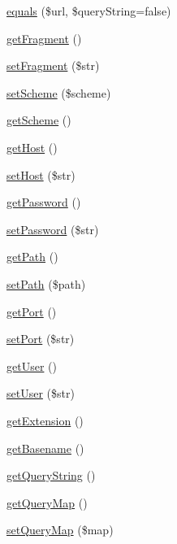 \begin{DoxyCompactItemize}
\item 
\hyperlink{classTk_1_1Url_a4443ec0cf0873b3e31e0676c4fb6e423}{equals} (\$url, \$query\+String=false)
\item 
\hyperlink{classTk_1_1Url_a009cd4a4ff09077a58b479680b7bdbcc}{get\+Fragment} ()
\item 
\hyperlink{classTk_1_1Url_a1a6eead78c87c4f6c35da486ac85d7f7}{set\+Fragment} (\$str)
\item 
\hyperlink{classTk_1_1Url_a0b5267cc8d82e281509034fb0216f514}{set\+Scheme} (\$scheme)
\item 
\hyperlink{classTk_1_1Url_a7fe674003b6c53a3f04985d9088009ed}{get\+Scheme} ()
\item 
\hyperlink{classTk_1_1Url_a2647348843d39360e840bf73aca68e88}{get\+Host} ()
\item 
\hyperlink{classTk_1_1Url_a32e108539519932d58e8461ef388db18}{set\+Host} (\$str)
\item 
\hyperlink{classTk_1_1Url_a65bdadc61c45e199f6bfe099c957a4dc}{get\+Password} ()
\item 
\hyperlink{classTk_1_1Url_a3024ff0d9097a2cfac17ef25ac98f2ae}{set\+Password} (\$str)
\item 
\hyperlink{classTk_1_1Url_a4b6ce39e9dafb8f65d80ce01cfdc1f1d}{get\+Path} ()
\item 
\hyperlink{classTk_1_1Url_a770e06f6061d4b9cdd3b8ad7bf702604}{set\+Path} (\$path)
\item 
\hyperlink{classTk_1_1Url_a03c20f59e925f997dd33967fcbf03ee3}{get\+Port} ()
\item 
\hyperlink{classTk_1_1Url_ac52d23031164b8bd9e186aa6ea105fab}{set\+Port} (\$str)
\item 
\hyperlink{classTk_1_1Url_a73d906c5be3282cc522010417277b5e4}{get\+User} ()
\item 
\hyperlink{classTk_1_1Url_a7baf85be14e5f43d6027334cd2efbbb7}{set\+User} (\$str)
\item 
\hyperlink{classTk_1_1Url_ad160b53d3339514b51490afcf6ddd142}{get\+Extension} ()
\item 
\hyperlink{classTk_1_1Url_ab97411ab33d8639f04a5015249a3a6d0}{get\+Basename} ()
\item 
\hyperlink{classTk_1_1Url_a3d9a6a55343b78a64335784ecf2a82ad}{get\+Query\+String} ()
\item 
\hyperlink{classTk_1_1Url_a47e2aa0886f7d725b67cc061d1df12bf}{get\+Query\+Map} ()
\item 
\hyperlink{classTk_1_1Url_ae3aaa740a79236c0c67d8a127bc55566}{set\+Query\+Map} (\$map)
\item 

\end{DoxyCompactItemize}
